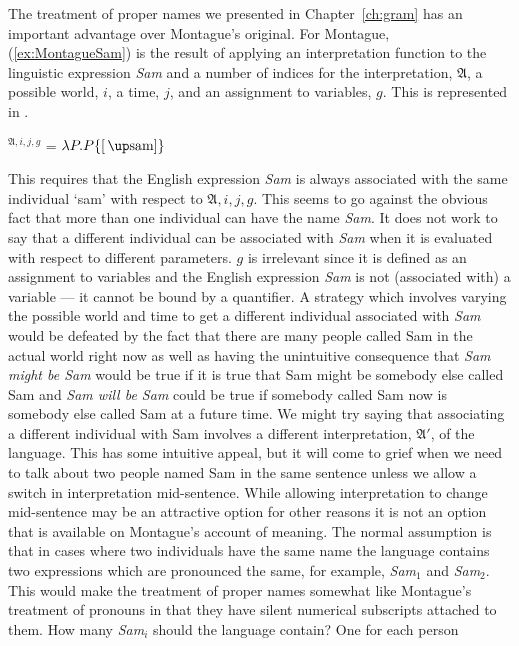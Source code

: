 The treatment of proper names we presented in Chapter~\ref{ch:gram}
has an important advantage over
Montague's original.  For Montague, (\ref{ex:MontagueSam}) is the
result of applying an interpretation function to the linguistic
expression \textit{Sam} and a number of indices for the
interpretation, $\mathfrak{A}$, a possible world, $i$, a time, $j$,
and an assignment to variables, $g$.  This is represented in
\nexteg{}.
\begin{ex} 
$^{\mathfrak{A},i,j,g}$ = $\lambda P.P\{[\,\up\mathrm{sam}]\}$ 
\end{ex} 
This requires that the English expression \textit{Sam} is always
associated with the same individual `sam' with respect to
$\mathfrak{A},i,j,g$.  This seems to go against the obvious fact that
more than one individual can have the name \textit{Sam}.  It does not
work to say that a different individual can be associated with
\textit{Sam} when it is evaluated with respect to different
parameters.  $g$ is irrelevant since it is defined as an assignment to
variables and the English expression \textit{Sam} is not (associated
with) a variable --- it cannot be bound by a quantifier.  A strategy
which involves varying the
possible world and time to get a different individual associated with
\textit{Sam} would be defeated by the fact that there are many people
called Sam in the actual world right now as well as having the
unintuitive consequence that \textit{Sam might be Sam} would be true if it is true
that Sam might be somebody else called Sam and \textit{Sam will be
  Sam} could be true if somebody called Sam now is somebody else
called Sam at a future time.  We might try saying that associating a
different individual with Sam involves a different interpretation,
$\mathfrak{A}'$, of the language.  This has some intuitive appeal, but
it will come to grief when we need to talk about two people named Sam
in the same sentence unless we allow a switch in interpretation
mid-sentence.  While allowing interpretation to change mid-sentence
may be an attractive option for other reasons it is not an option that
is available on Montague's account of meaning.  The normal assumption
is that in cases where two individuals have the same name the language
contains two expressions which are pronounced the same, for example,
\textit{Sam}$_1$ and \textit{Sam}$_2$.  This would make the treatment
of proper names somewhat like Montague's treatment of pronouns in that
they have silent numerical subscripts attached to them.  How many
\textit{Sam}$_i$ should the language contain? One for each person
